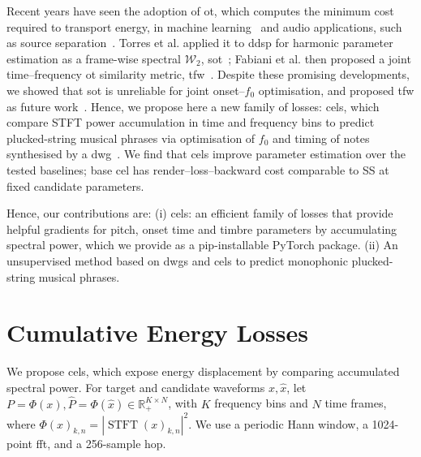 \documentclass[letterpaper]{article}
\begin{document}
Recent years have seen the adoption of \gls{ot}, which computes the minimum cost required to transport energy, in machine learning~\cite{peyre2019computational} and audio applications, such as source separation~\cite{rolet2018blind}. Torres et al. applied it to \gls{ddsp} for harmonic parameter estimation as a frame-wise spectral $\mathcal{W}_2$, \gls{sot}~\cite{torres2024sot}; Fabiani et al. then proposed a joint time--frequency \gls{ot} similarity metric, \gls{tfw}~\cite{fabiani2024jtfot}. Despite these promising developments, we showed that \gls{sot} is unreliable for joint onset--$f_0$ optimisation, and proposed \gls{tfw} as future work~\cite{tablasdepaula2026karplus}. Hence, we propose here a new family of losses: \glspl{cel}, which compare STFT power accumulation in time and frequency bins to predict plucked-string musical phrases via optimisation of $f_0$ and timing of notes synthesised by a \gls{dwg}~\cite{smith2010physical}. We find that \glspl{cel} improve parameter estimation over the tested baselines; base \gls{cel} has render--loss--backward cost comparable to SS at fixed candidate parameters.

Hence, our contributions are: (i) \glspl{cel}: an efficient family of losses that provide helpful gradients for pitch, onset time and timbre parameters by accumulating spectral power, which we provide as a pip-installable PyTorch package. (ii) An unsupervised method based on \glspl{dwg} and \glspl{cel} to predict monophonic plucked-string musical phrases.

\section{Cumulative Energy Losses}
\label{sec:losses}

We propose \Glspl{cel}, which expose energy displacement by comparing
accumulated spectral power. For target and candidate waveforms $x,\hat x$, let
$P=\Phi(x),\hat P=\Phi(\hat x)\in\mathbb R_+^{K\times N}$, with $K$ frequency bins and $N$ time frames, where
$\Phi(x)_{k,n}=|\operatorname{STFT}(x)_{k,n}|^2$. We use a periodic Hann
window, a 1024-point \gls{fft}, and a 256-sample hop.

\newcommand{\dvec}{\boldsymbol{d}}
\newcommand{\dt}{d_\mathrm{t}}
\newcommand{\df}{d_\mathrm{f}}
\newcommand{\ttype}{\mathrm{t}}
\newcommand{\ftype}{\mathrm{f}}
\end{document}
